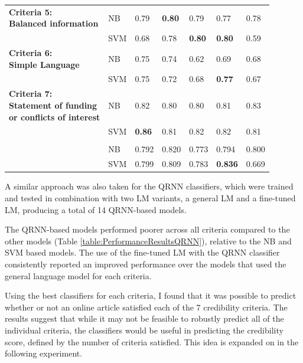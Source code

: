 \documentclass[a4paper,twoside,phd]{BYUPhys}
\begin{document}
\begin{table}[H]
{\begin{tabular}{|p{6cm}|p{2.6cm}|p{2.6cm}|p{2.6cm}|p{2.6cm}|p{2.6cm}|p{2.6cm}|}
			
			\multirowcell{2}{\textbf{Criteria 5:} \\ \textbf{Balanced information}} 
			& NB & 0.79 & \textbf{0.80} & 0.79 & 0.77 & 0.78 \\ 
			& SVM & 0.68 & 0.78 & \textbf{0.80} & \textbf{0.80} & 0.59 \\
			\hline 
			
			
			\multirowcell{2}{\textbf{Criteria 6:} \\ \textbf{Simple Language}} & NB & 0.75 & 0.74 & 0.62 & 0.69 & 0.68 \\ 
			& SVM & 0.75 & 0.72 & 0.68 & \textbf{0.77} & 0.67 \\
			\hline 
			
			
			\multirowcell{3}{\textbf{Criteria 7:} \\ \textbf{Statement of funding} \\ \textbf{or conflicts of interest}} 
			& NB & 0.82 & 0.80 & 0.80 & 0.81 & 0.83 \\ 
			& SVM & \textbf{0.86} & 0.81 & 0.82 & 0.82 & 0.81 \\ & & & & & & \\ 
			\hline 
			
			
			\multirowcell{2}{\textbf{Average} \textbf{Performance}} & NB & 0.792 & 0.820 & 0.773 & 0.794 & 0.800      \\ 
			& SVM & 0.799 & 0.809 & 0.783 & \textbf{0.836} & 0.669      \\
			\hline                                                                                                                                          
	\end{tabular}}
	\label{table:PerformanceResultsNBSVM}
\end{table}

A similar approach was also taken for the QRNN classifiers, which were trained and tested in combination with two LM variants, a general LM and a fine-tuned LM, producing a total of 14 QRNN-based models. \newline

The QRNN-based models performed poorer across all criteria compared to the other models (Table \ref{table:PerformanceResultsQRNN}), relative to the NB and SVM based models. The use of the fine-tuned LM with the QRNN classifier consistently reported an improved performance over the models that used the general language model for each criteria. \newline

Using the best classifiers for each criteria, I found that it was possible to predict whether or not an online article satisfied each of the 7 credibility criteria. The results suggest that while it may not be feasible to robustly predict all of the individual criteria, the classifiers would be useful in predicting the credibility score, defined by the number of criteria satisfied. This idea is expanded on in the following experiment.
\end{document}

